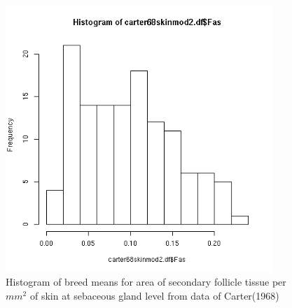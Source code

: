 %

\begin{figure}[!h]
  \centering
   \includegraphics[width=0.9\textwidth]{fashist.png}
  \caption{Histogram of breed means for area of secondary follicle tissue per $mm^{2}$ of skin at sebaceous gland level from data of Carter(1968)~\cite{cart:68}}
  \label{fig:fashist}
\end{figure}

%


